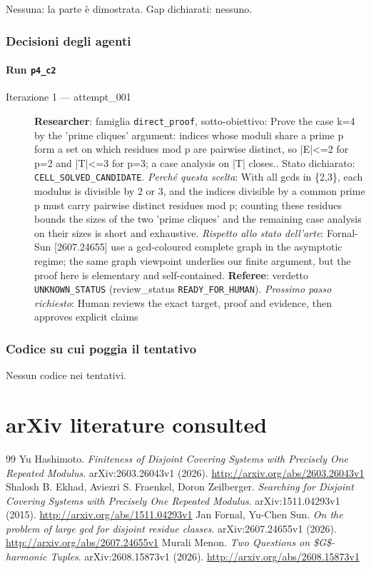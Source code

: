 \documentclass[11pt,a4paper]{article}
\begin{document}
Nessuna: la parte è dimostrata. Gap dichiarati: nessuno.

\subsubsection{Decisioni degli agenti}
\paragraph{Run \texttt{p4\_c2}}
\begin{description}
\item[Iterazione 1 — attempt\_001]
\textbf{Researcher}: famiglia \texttt{direct\_proof}, sotto-obiettivo: Prove the case k=4 by the 'prime cliques' argument: indices whose moduli share a prime p form a set on which residues mod p are pairwise distinct, so |E|\textless{}=2 for p=2 and |T|\textless{}=3 for p=3; a case analysis on |T| closes.. Stato dichiarato: \texttt{CELL\_SOLVED\_CANDIDATE}.
\emph{Perché questa scelta}: With all gcds in \{2,3\}, each modulus is divisible by 2 or 3, and the indices divisible by a common prime p must carry pairwise distinct residues mod p; counting these residues bounds the sizes of the two 'prime cliques' and the remaining case analysis on their sizes is short and exhaustive.
\emph{Rispetto allo stato dell'arte}: Fornal-Sun [2607.24655] use a gcd-coloured complete graph in the asymptotic regime; the same graph viewpoint underlies our finite argument, but the proof here is elementary and self-contained.
\textbf{Referee}: verdetto \texttt{UNKNOWN\_STATUS} (review\_status \texttt{READY\_FOR\_HUMAN}).
\emph{Prossimo passo richiesto}: Human reviews the exact target, proof and evidence, then approves explicit claims
\end{description}

\subsubsection{Codice su cui poggia il tentativo}
Nessun codice nei tentativi.

\section{arXiv literature consulted}
\begin{thebibliography}{99}
 Yu Hashimoto. \emph{Finiteness of Disjoint Covering Systems with Precisely One Repeated Modulus}. arXiv:2603.26043v1 (2026). \url{http://arxiv.org/abs/2603.26043v1}
 Shalosh B. Ekhad, Aviezri S. Fraenkel, Doron Zeilberger. \emph{Searching for Disjoint Covering Systems with Precisely One Repeated Modulus}. arXiv:1511.04293v1 (2015). \url{http://arxiv.org/abs/1511.04293v1}
 Jan Fornal, Yu-Chen Sun. \emph{On the problem of large gcd for disjoint residue classes}. arXiv:2607.24655v1 (2026). \url{http://arxiv.org/abs/2607.24655v1}
 Murali Menon. \emph{Two Questions on \$G\$-harmonic Tuples}. arXiv:2608.15873v1 (2026). \url{http://arxiv.org/abs/2608.15873v1}
\end{thebibliography}
\end{document}
